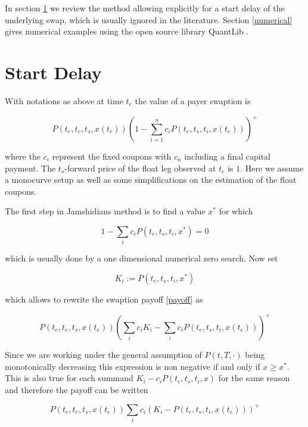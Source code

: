 \documentclass{amsart}
\theoremstyle{plain}
\numberwithin{equation}{section}
\begin{document}
In section \ref{delay} we review the method allowing explicitly for a start delay of the underlying swap, which is usually ignored in the literature. Section \ref{numerical} gives numerical examples using the open source library QuantLib \cite{ql}. 

\section{Start Delay}\label{delay}

With notations as above at time $t_e$ the value of a payer swaption is

\begin{equation}\label{payoff}
P(t_e,t_e,t_s,x(t_e)) \left( 1 - \sum_{i=1}^n c_i P(t_e,t_s,t_i,x(t_e)) \right)^+
\end{equation}

where the $c_i$ represent the fixed coupons with $c_n$ including a final capital payment. The $t_s$-forward price of the float leg observed at $t_e$ is $1$. Here we assume a monocurve setup as well as some simplifications on the estimation of the float coupons.

The first step in Jamshidians method is to find a value $x^*$ for which

\begin{equation}
1 - \sum_{i} c_i P(t_e,t_s,t_i,x^*) = 0
\end{equation}

which is usually done by a one dimensional numerical zero search. Now set

\begin{equation}\label{strikes}
K_i := P(t_e,t_s,t_i,x^*)
\end{equation}

which allows to rewrite the swaption payoff \ref{payoff} as

\begin{equation}
P(t_e,t_e,t_s,x(t_e)) \left( \sum_i c_i K_i - \sum_i c_i P(t_e,t_s,t_i,x(t_e)) \right)^+
\end{equation}

Since we are working under the general assumption of $P(t,T,\cdot)$ being monotonically decreasing this expression is non negative if and only if $x\geq x^*$. This is also true for each summand $K_i - c_iP(t_e,t_s,t_i,x)$ for the same reason and therefore the payoff can be written

\begin{equation}\label{zerobondoption}
P(t_e,t_e,t_s,x(t_e)) \sum_i c_i \left( K_i - P(t_e,t_s,t_i,x(t_e)) \right)^+
\end{equation}
\end{document}

